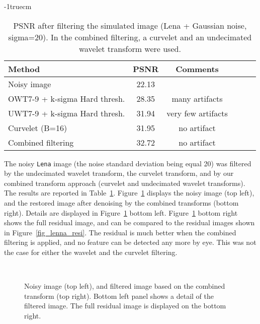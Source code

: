 \voffset -1truecm
\begin{table}[htb]
\begin{center}
\begin{tabular}{lccccc} \hline \hline
Method                          & PSNR   &  Comments   \\ \hline \hline
Noisy image                     & 22.13  &     \\
OWT7-9 + k-sigma  Hard thresh.   & 28.35  &   many artifacts \\
UWT7-9 + k-sigma  Hard thresh.   & 31.94  &   very few artifacts \\
Curvelet (B=16)                 & 31.95  &   no artifact  \\ 
Combined filtering              & 32.72  &   no artifact  \\ \hline \hline
\end{tabular}
\caption{PSNR after filtering the simulated image (Lena + Gaussian 
noise, sigma=20).
In the combined filtering, a curvelet and an undecimated wavelet
transform were used.}
\vspace{0.5cm}
\label{comptab2}
\end{center}
\end{table}

The noisy {\tt Lena} image (the noise standard deviation being equal 20)
was filtered by the undecimated
wavelet transform, the curvelet transform, and by our combined
transform approach (curvelet and undecimated wavelet transforms). The
results are reported in Table~\ref{comptab2}.
Figure~\ref{fig_cb2_lenna} displays the noisy image (top left), and
the restored image after denoising by the combined transforms (bottom right). 
Details are
displayed in Figure~\ref{fig_cb2_lenna} bottom left.  
Figure~\ref{fig_cb2_lenna}  bottom  right shows the full residual image, and 
can be compared  to the residual images shown in Figure~\ref{fig_lenna_resi}.
The residual is much better when the combined filtering is applied, and no
feature can be detected any more by eye. This was not the case for either the
wavelet and the curvelet filtering.

\begin{figure}[htb]
\centerline{ 
\vbox{ 
\hbox{
 }
\hbox{
}	
}}
\caption{Noisy image (top left), and filtered image based on the
  combined transform (top right). Bottom left panel shows a detail 
  of the filtered image. The full residual image is displayed on the bottom right.}
\label{fig_cb2_lenna}
\end{figure}

